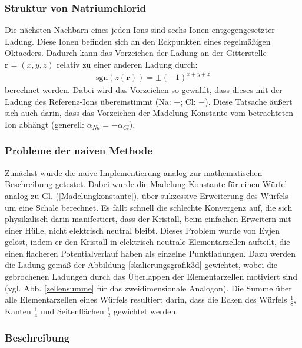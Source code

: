\documentclass[10pt,a4paper]{article}
\begin{document}
\subsubsection{Struktur von Natriumchlorid}

Die nächsten Nachbarn eines jeden Ions sind sechs Ionen entgegengesetzter
Ladung. Diese Ionen befinden sich an den Eckpunkten eines regelmäßigen
Oktaeders. Dadurch kann das Vorzeichen der Ladung an der Gitterstelle
$\mathbf{r} = \left( x,y,z \right)$ relativ zu einer anderen Ladung durch:
\begin{align}
\mathrm{sgn}\left(z(\mathbf{r})\right) = \pm \left( -1 \right)^{x+y+z}
\label{eq:vorzeichen}
\end{align}
berechnet werden. Dabei wird das Vorzeichen so gewählt, dass dieses mit der Ladung
des Referenz-Ions übereinstimmt (Na: $+$; Cl: $-$). Diese Tatsache
äußert sich auch darin, dass das Vorzeichen der Madelung-Konstante vom
betrachteten Ion abhängt (generell: $\alpha_{Na} = - \alpha_{Cl}$).
\subsubsection{Probleme der naiven Methode}

Zunächst wurde die naive Implementierung analog zur mathematischen Beschreibung
getestet. Dabei wurde die Madelung-Konstante für einen Würfel analog zu
Gl. (\ref{Madelungkonstante}), über sukzessive Erweiterung des Würfels um eine
Schale berechnet. Es fällt schnell die schlechte Konvergenz auf, die sich
physikalisch darin manifestiert, dass der Kristall, beim einfachen Erweitern
mit einer Hülle, nicht elektrisch neutral bleibt. Dieses Problem wurde von Evjen
\cite{Evjen} gelöst, indem er den Kristall in elektrisch neutrale Elementarzellen
aufteilt, die einen flacheren Potentialverlauf haben als einzelne Punktladungen.
Dazu werden die Ladung gemäß der Abbildung \ref{skalierungsgrafik3d} gewichtet, wobei
die gebrochenen Ladungen durch das Überlappen der Elementarzellen motiviert sind
(vgl. Abb. \ref{zellensumme} für das zweidimensionale Analogon). Die Summe über 
alle Elementarzellen eines Würfels resultiert darin, dass die Ecken des Würfels
$\frac{1}{8}$, Kanten $\frac{1}{4}$ und Seitenflächen $\frac{1}{2}$ gewichtet werden.

\subsubsection{Beschreibung}
\end{document}
